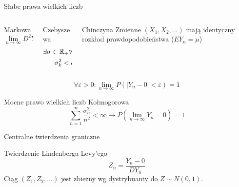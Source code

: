 \documentclass{mp}
\begin{document}
\begin{frame}{Słabe prawa wielkich liczb}
\begin{columns}[T]
\begin{column}{.30\textwidth}
{
\begin{block}{Markowa}
\[\lim_{n\to\infty} D^2Y_n=0 \]
\end{block}
}
\end{column}
\begin{column}{.30\textwidth}
{
\begin{block}{Czebyszewa}
\begin{gather*}
\exists \sigma\in\mathbb{R}_{+}\forall k\in\mathbb{N} \\
\sigma_k^2<\sigma^2
\end{gather*}
\end{block}
}
\end{column}
\begin{column}{.30\textwidth}
{
\begin{block}{Chinczyna}
Zmienne $(X_1, X_2, \ldots)$ mają identyczny rozkład prawdopodobieństwa
($EY_n=\mu$)
\end{block}
}
\end{column}
\end{columns}
\begin{block}{}
\[ \forall \varepsilon>0\colon \lim_{n\to\infty} P(\left|Y_n-0\right|<\varepsilon)=1 \]
\end{block}
\end{frame}
\begin{frame}{Mocne prawo wielkich liczb Kołmogorowa}
\[ \sum_{n=1}^\infty \frac{\sigma_n^2}{n^2}<\infty \to P(\lim_{n\to\infty} Y_n=0)=1 \]
\end{frame}
\begin{frame}{Centralne twierdzenia graniczne}
\begin{block}{Twierdzenie Lindenberga-Levy'ego}
\[ Z_n=\frac{Y_n-0}{DY_n} \]
Ciąg $(Z_1,Z_2,\ldots)$ jest zbieżny wg dystrybuanty do $Z\sim N(0,1)$.
\end{block}
\end{frame}
\end{document}
